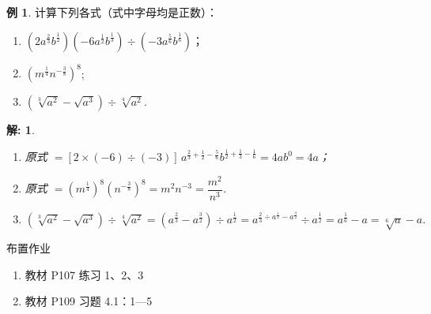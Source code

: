 \documentclass[aspectratio=169,13pt,t,fleqn] {beamer}
\newtheorem*{solve}{解:}
\theoremstyle{definition}
\newtheorem{exam}{例}
\begin{document}
\begin{frame}{}
	\begin{exam}
		计算下列各式（式中字母均是正数）：
		\begin{enumerate}[(1)]
			\item \(\left(2a^{\frac{2}{3}}b^{\frac{1}{2}}\right)\left(-6a^{\frac{1}{2}}b^{\frac{1}{3}}\right)\div\left(-3a^{\frac{5}{6}}b^{\frac{1}{6}}\right)\)；
			\item \(\left(m^{\frac{1}{4}}n^{-\frac{3}{8}}\right)^8\);
			\item $(\sqrt[3]{a^2} - \sqrt{a^3}) \div \sqrt[4]{a^2}$.
		\end{enumerate}
	\end{exam}
	\pause
	\begin{solve}
		\begin{enumerate}[(1)]
			\item 原式 \(=[2\times(-6)\div(-3)]\,a^{\frac{2}{3}+\frac{1}{2}-\frac{5}{6}}b^{\frac{1}{2}+\frac{1}{3}-\frac{1}{6}}=4ab^{0}=4a\)；
			\item 原式 \(=(m^{\frac{1}{4}})^8(n^{-\frac{3}{8}})^8=m^2 n^{-3}=\dfrac{m^2}{n^3}\).
			\item $(\sqrt[3]{a^2} - \sqrt{a^3}) \div \sqrt[4]{a^2}=(a^{\frac{2}{3}} - a^{\frac{3}{2}}) \div a^{\frac{1}{2}} = a^{\frac{2}{3} \div a^{\frac{1}{2}} - a^{\frac{3}{2}}} \div a^{\frac{1}{2}} = a^{\frac{1}{6}} -a = \sqrt[6]{a} -a.$
		\end{enumerate}
	\end{solve}
\end{frame}

\begin{frame}{布置作业}
	\begin{summarybox}[课后作业]
		\begin{enumerate}
			\item 教材 P107 练习 1、2、3
			\item 教材 P109 习题 4.1：1---5
			
		\end{enumerate}
	\end{summarybox}
\end{frame}
\end{document}
